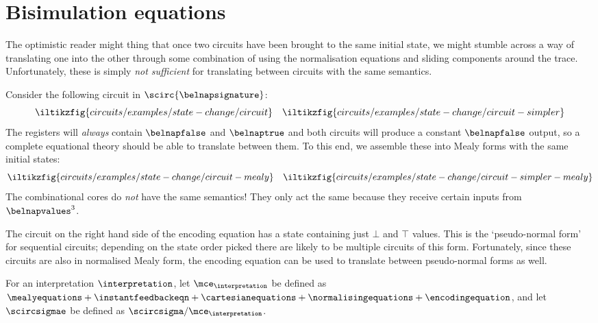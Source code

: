 
\section{Bisimulation equations}

The optimistic reader might thing that once two circuits have been brought to
the same initial state, we might stumble across a way of translating one into
the other through some combination of using the normalisation equations and
sliding components around the trace.
Unfortunately, these is simply \emph{not sufficient} for
translating between circuits with the same semantics.

\begin{example}
    Consider the following circuit in \(\scirc{\belnapsignature}\): \[
        \iltikzfig{circuits/examples/state-change/circuit}
        \quad
        \iltikzfig{circuits/examples/state-change/circuit-simpler}
    \]
    The registers will \emph{always} contain
    \(\belnapfalse\) and \(\belnaptrue\) and both circuits will
    produce a constant \(\belnapfalse\) output, so a complete equational theory
    should be able to translate between them.
    To this end, we assemble these into Mealy forms with the same initial states:
    \[
        \iltikzfig{circuits/examples/state-change/circuit-mealy}
        \quad
        \iltikzfig{circuits/examples/state-change/circuit-simpler-mealy}
    \]
    The combinational cores do \emph{not} have the same semantics!
    They only act the same because they receive certain inputs
    from \(\belnapvalues^{3}\).
\end{example}


The circuit on the right hand side of the encoding equation has a state
containing just \(\bot\) and \(\top\) values.
This is the `pseudo-normal form' for sequential circuits; depending on the
state order picked there are likely to be multiple circuits of this form.
Fortunately, since these circuits are also in normalised Mealy form, the
encoding equation can be used to translate between pseudo-normal forms as well.

\begin{definition}
    For an interpretation \(\interpretation\), let
    \(\mce_{\interpretation}\) be defined as \(
    \mealyequations +
    \instantfeedbackeqn +
    \cartesianequations +
    \normalisingequations +
    \encodingequation
    \), and let \(\scircsigmae\) be defined as
    \(\scircsigma / \mce_{\interpretation}\).
\end{definition}

